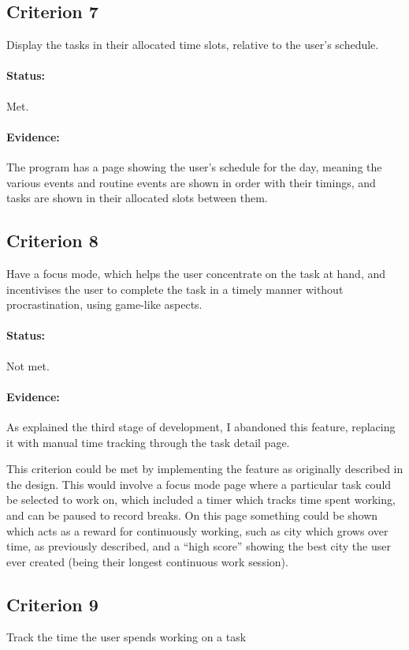 \documentclass{article}
\begin{document}
\subsection*{Criterion 7}
Display the tasks in their allocated time slots,
relative to the user's schedule.

\paragraph{Status:}
Met.

\paragraph{Evidence:}
The program has a page showing the user's schedule for the day,
meaning the various events and routine events are shown in order with their timings,
and tasks are shown in their allocated slots between them.

\subsection*{Criterion 8}
Have a focus mode, which helps the user concentrate on the task at hand,
and incentivises the user to complete the task in a timely manner without
procrastination, using game-like aspects.

\paragraph{Status:}
Not met.

\paragraph{Evidence:}
As explained the third stage of development,
I abandoned this feature,
replacing it with manual time tracking through the task detail page.

This criterion could be met by implementing the feature as originally described in the design.
This would involve a focus mode page where a particular task could be selected to work on,
which included a timer which tracks time spent working,
and can be paused to record breaks.
On this page something could be shown which acts as a reward for continuously working,
such as city which grows over time,
as previously described,
and a ``high score'' showing the best city the user ever created
(being their longest continuous work session).

\subsection*{Criterion 9}
Track the time the user spends working on a task
\end{document}
